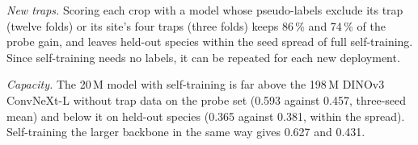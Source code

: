 \emph{New traps.} Scoring each crop with a model whose pseudo-labels exclude its trap (twelve folds) or its site's four traps (three folds) keeps 86\,\% and 74\,\% of the probe gain, and leaves held-out species within the seed spread of full self-training.
Since self-training needs no labels, it can be repeated for each new deployment.

\emph{Capacity.} The 20\,M model with self-training is far above the 198\,M DINOv3 ConvNeXt-L without trap data on the probe set (0.593 against 0.457, three-seed mean) and below it on held-out species (0.365 against 0.381, within the spread).
Self-training the larger backbone in the same way gives 0.627 and 0.431.
